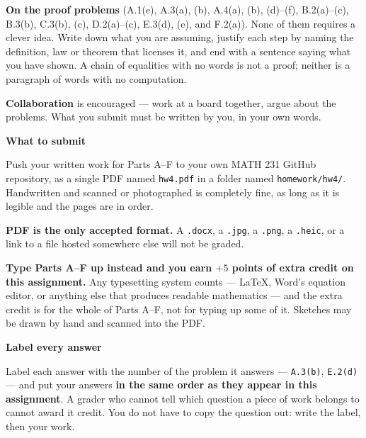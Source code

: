 \documentclass[11pt]{article}
\newcounter{prob}[section]
\newenvironment{callout}[1]
  {\par\medskip\needspace{5\baselineskip}%
   \begin{lrbox}{\qcbox}%
   \begin{minipage}{\dimexpr\textwidth-2\fboxsep-4pt}%
   \setlength{\parskip}{0.4em}%
   \textbf{\sffamily\color{RoyalBlue}#1}\par}
  {\end{minipage}\end{lrbox}%
   \begin{center}\colorbox{softbg}{\usebox{\qcbox}}\end{center}\medskip}
\begin{document}
\smallskip
\noindent\textbf{On the proof problems} (A.1(e), A.3(a), (b), A.4(a), (b), (d)--(f),
B.2(a)--(c), B.3(b), C.3(b), (c), D.2(a)--(c), E.3(d), (e), and F.2(a)). None
of them requires a clever idea. Write down what you are assuming, justify each
step by naming the definition, law or theorem that licenses it, and end with a
sentence saying what you have shown. A chain of equalities with no words is not
a proof; neither is a paragraph of words with no computation.

\smallskip
\noindent\textbf{Collaboration} is encouraged --- work at a board together, argue
about the problems. What you submit must be written by you, in your own words.

\begin{callout}{What to submit}
Push your written work for Parts A--F to your own MATH 231 GitHub repository,
as a single PDF named \texttt{hw4.pdf} in a folder named \texttt{homework/hw4/}.
Handwritten and scanned or photographed is completely fine, as long as it is
legible and the pages are in order.

\textbf{PDF is the only accepted format.} A \texttt{.docx}, a \texttt{.jpg}, a
\texttt{.png}, a \texttt{.heic}, or a link to a file hosted somewhere else will
not be graded.

\textbf{Type Parts A--F up instead and you earn $+5$ points of extra credit on
this assignment.} Any typesetting system counts --- \LaTeX, Word's equation
editor, or anything else that produces readable mathematics --- and the extra
credit is for the whole of Parts A--F, not for typing up some of it. Sketches
may be drawn by hand and scanned into the PDF.
\end{callout}

\begin{callout}{Label every answer}
Label each answer with the number of the problem it answers --- \texttt{A.3(b)},
\texttt{E.2(d)} --- and put your answers \textbf{in the same order as they
appear in this assignment}. A grader who cannot tell which question a piece of
work belongs to cannot award it credit. You do not have to copy the question
out: write the label, then your work.
\end{callout}

\end{document}
